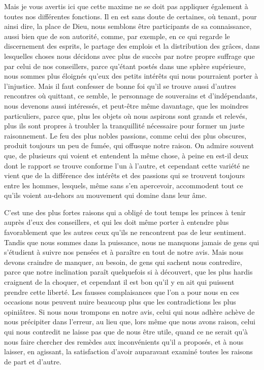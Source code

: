 \documentclass[french,twoside]{book} %
\begin{document}
Mais je vous avertis ici que cette maxime ne se doit pas appliquer également à toutes nos différentes fonctions. Il en est sans doute de certaines, où tenant, pour ainsi dire, la place de Dieu, nous semblons être participants de sa connaissance, aussi bien que de son autorité, comme, par exemple, en ce qui regarde le discernement des esprits, le partage des emplois et la distribution des grâces, dans lesquelles choses nous décidons avec plus de succès par notre propre suffrage que par celui de nos conseillers, parce qu’étant postés dans une sphère supérieure, nous sommes plus éloignés qu’eux des petits intérêts qui nous pourraient porter à l’injustice. Mais il faut confesser de bonne foi qu’il se trouve aussi d’autres rencontres où quittant, ce semble, le personnage de souverains et d’indépendants, nous devenons aussi intéressés, et peut-être même davantage, que les moindres particuliers, parce que, plus les objets où nous aspirons sont grands et relevés, plus ils sont propres à troubler la tranquillité nécessaire pour former un juste raisonnement. Le feu des plus nobles passions, comme celui des plus obscures, produit toujours un peu de fumée, qui offusque notre raison. On admire souvent que, de plusieurs qui voient et entendent la même chose, à peine en est-il deux dont le rapport se trouve conforme l’un à l’autre, et cependant cette variété ne vient que de la différence des intérêts et des passions qui se trouvent toujours entre les hommes, lesquels, même sans s’en apercevoir, accommodent tout ce qu’ils voient au-dehors au mouvement qui domine dans leur âme.\par
C’est une des plus fortes raisons qui a obligé de tout temps les princes à tenir auprès d’eux des conseillers, et qui les doit même porter à entendre plus favorablement que les autres ceux qu’ils ne rencontrent pas de leur sentiment. Tandis que nous sommes dans la puissance, nous ne manquons jamais de gens qui s’étudient à suivre nos pensées et à paraître en tout de notre avis. Mais nous devons craindre de manquer, au besoin, de gens qui sachent nous contredire, parce que notre inclination paraît quelquefois si à découvert, que les plus hardis craignent de la choquer, et cependant il est bon qu’il y en ait qui puissent prendre cette liberté. Les fausses complaisances que l’on a pour nous en ces occasions nous peuvent nuire beaucoup plus que les contradictions les plus opiniâtres. Si nous nous trompons en notre avis, celui qui nous adhère achève de nous précipiter dans l’erreur, au lieu que, lors même que nous avons raison, celui qui nous contredit ne laisse pas que de nous être utile, quand ce ne serait qu’à nous faire chercher des remèdes aux inconvénients qu’il a proposés, et à nous laisser, en agissant, la satisfaction d’avoir auparavant examiné toutes les raisons de part et d’autre.\par
\end{document}
